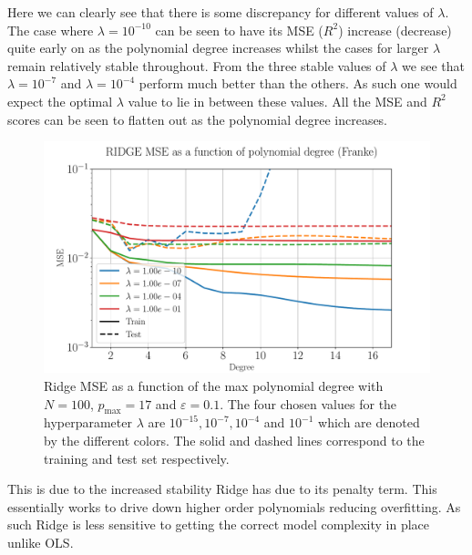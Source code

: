 \documentclass[%
reprint,
amsmath,amssymb,
aps,
pra,
]{revtex4-2}
\begin{document}
Here we can clearly see that there is some discrepancy for different values of $\lambda$. The case where $\lambda=10^{-10}$ can be seen to have its MSE ($R^2$) increase (decrease) quite early on as the polynomial degree increases whilst the cases for larger $\lambda$ remain relatively stable throughout. From the three stable values of $\lambda$ we see that $\lambda=10^{-7}$ and $\lambda=10^{-4}$ perform much better than the others. As such one would expect the optimal $\lambda$ value to lie in between these values. All the MSE and $R^2$ scores can be seen to flatten out as the polynomial degree increases. 
\begin{figure}[ht!]
	\centering
	\includegraphics[width=\linewidth]{Python/Figures/Ridge/RIDGE_MSE_Unscaled.pdf}
	\caption{Ridge MSE as a function of the max polynomial degree with \(N=100\), \(p_{\text{max}}=17\) and \(\varepsilon=0.1\). The four chosen values for the hyperparameter $\lambda$ are $10^{-15},10^{-7},10^{-4}$ and $10^{-1}$ which are denoted by the different colors. The solid and dashed lines correspond to the training and test set respectively.}
	\label{fig:ridge_mse_degree}
\end{figure}
This is due to the increased stability Ridge has due to its penalty term. This essentially works to drive down higher order polynomials reducing overfitting. As such Ridge is less sensitive to getting the correct model complexity in place unlike OLS.
\end{document}
